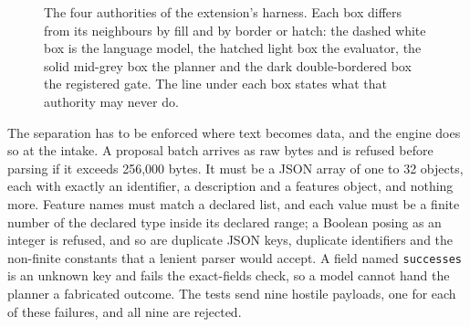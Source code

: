 \begin{figure}[ht]
\centering
{}
\caption{The four authorities of the extension's harness. Each box differs from its neighbours by fill
and by border or hatch: the dashed white box is the language model, the hatched light box the
evaluator, the solid mid-grey box the planner and the dark double-bordered box the registered gate.
The line under each box states what that authority may never do.}
\label{c22:fig-auth}
\end{figure}

The separation has to be enforced where text becomes data, and the engine does so at the intake. A
proposal batch arrives as raw bytes and is refused before parsing if it exceeds 256,000 bytes. It
must be a JSON array of one to 32 objects, each with exactly an identifier, a description and a
features object, and nothing more. Feature names must match a declared list, and each value must
be a finite number of the declared type inside its declared range; a Boolean posing as an integer
is refused, and so are duplicate JSON keys, duplicate identifiers and the non-finite constants
that a lenient parser would accept. A field named \texttt{successes} is an unknown key and fails the
exact-fields check, so a model cannot hand the planner a fabricated outcome. The tests send nine
hostile payloads, one for each of these failures, and all nine are rejected.

